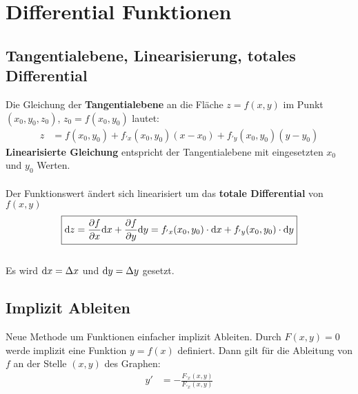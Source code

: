 



\chapter{Differential Funktionen}
\section{Tangentialebene, Linearisierung, totales Differential}
Die Gleichung der \textbf{Tangentialebene} an die Fläche $z=f(x,y)$ im Punkt$(x_0,y_0,z_0)$, $z_0=f(x_0,y_0)$ lautet:
\[
\boxed{\begin{aligned}	
		z&=f(x_0,y_0) + f_{'x}(x_0,y_0)(x-x_0)+ f_{'y}(x_0,y_0)(y-y_0)
	\end{aligned}}\]
\newline
\textbf{Linearisierte Gleichung} entspricht der Tangentialebene mit eingesetzten $x_0$ und $y_0$ Werten.\\
\\
Der Funktionswert ändert sich linearisiert um das \textbf{totale Differential} von $f(x,y)$
\[\boxed{
	\mathrm{d} z = \frac{\partial f}{\partial x}\mathrm{d} x + \frac{\partial f}{\partial y}\mathrm{d} y = f_{'x}(x_0,y_0)\cdot\mathrm{d} x + f_{'y}(x_0,y_0)\cdot\mathrm{d} y
}\]\\
Es wird $\mathrm{d} x= \Delta x$ und $\mathrm{d} y= \Delta y$ gesetzt.
	
\section{Implizit Ableiten}
Neue Methode um Funktionen einfacher implizit Ableiten.
Durch $F(x,y)=0$ werde implizit eine Funktion $y=f(x)$ definiert. Dann gilt für die Ableitung von $f$ an der Stelle $(x,y)$ des Graphen:
\[
\boxed{\begin{aligned}	
		y'&=-\frac{F_{'x}(x,y)}{F_{'x}(x,y)}
	\end{aligned}}\]
	
